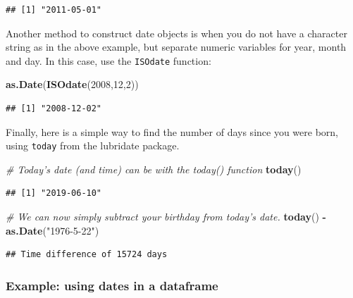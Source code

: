 \documentclass[]{book}
\newenvironment{Shaded}{\begin{snugshade}}{\end{snugshade}}
\newcommand{\CommentTok}[1]{\textcolor[rgb]{0.56,0.35,0.01}{\textit{#1}}}
\newcommand{\DecValTok}[1]{\textcolor[rgb]{0.00,0.00,0.81}{#1}}
\newcommand{\KeywordTok}[1]{\textcolor[rgb]{0.13,0.29,0.53}{\textbf{#1}}}
\newcommand{\NormalTok}[1]{#1}
\newcommand{\OperatorTok}[1]{\textcolor[rgb]{0.81,0.36,0.00}{\textbf{#1}}}
\newcommand{\StringTok}[1]{\textcolor[rgb]{0.31,0.60,0.02}{#1}}
\begin{document}
\begin{verbatim}
## [1] "2011-05-01"
\end{verbatim}

Another method to construct date objects is when you do not have a character string as in the above example, but separate numeric variables for year, month and day. In this case, use the \texttt{ISOdate} function:

\begin{Shaded}
\begin{Highlighting}[]
\KeywordTok{as.Date}\NormalTok{(}\KeywordTok{ISOdate}\NormalTok{(}\DecValTok{2008}\NormalTok{,}\DecValTok{12}\NormalTok{,}\DecValTok{2}\NormalTok{))}
\end{Highlighting}
\end{Shaded}

\begin{verbatim}
## [1] "2008-12-02"
\end{verbatim}

Finally, here is a simple way to find the number of days since you were born, using \texttt{today} from the lubridate package.

\begin{Shaded}
\begin{Highlighting}[]
\CommentTok{# Today's date (and time) can be with the today() function}
\KeywordTok{today}\NormalTok{()}
\end{Highlighting}
\end{Shaded}

\begin{verbatim}
## [1] "2019-06-10"
\end{verbatim}

\begin{Shaded}
\begin{Highlighting}[]
\CommentTok{# We can now simply subtract your birthday from today's date.}
\KeywordTok{today}\NormalTok{() }\OperatorTok{-}\StringTok{ }\KeywordTok{as.Date}\NormalTok{(}\StringTok{"1976-5-22"}\NormalTok{)}
\end{Highlighting}
\end{Shaded}

\begin{verbatim}
## Time difference of 15724 days
\end{verbatim}

\hypertarget{example-using-dates-in-a-dataframe}{%
\subsubsection{Example: using dates in a dataframe}\label{example-using-dates-in-a-dataframe}}
\end{document}
